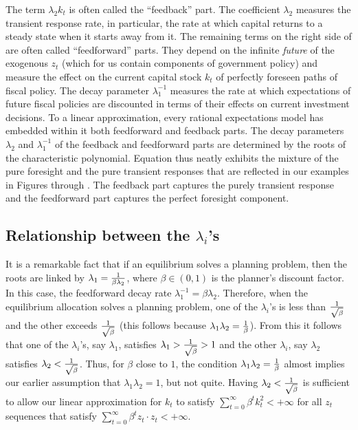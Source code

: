 The term $\lambda_2 k_t$ is often called
the ``feedback'' part.  The coefficient $\lambda_2$
measures the transient response rate, in particular, the rate at which
capital returns to a steady state when it starts away
from it.  The remaining terms on the right side of   
are often called  ``feedforward'' parts. They depend on the
infinite {\it future\/} of the exogenous $z_t$ (which for us
contain   components of government policy) and measure the
effect on the current capital stock $k_t$ of perfectly foreseen
paths of fiscal policy.
The decay parameter $\lambda_1^{-1}$ measures the rate at which
expectations of future fiscal policies are discounted in terms
of their effects on current investment decisions.
To a linear approximation, every rational expectations model has embedded within it both
feedforward and feedback parts.  The decay parameters
$\lambda_2$ and $\lambda_1^{-1}$ of the feedback and feedforward
parts are determined by the roots of the characteristic
polynomial.
  Equation  thus neatly exhibits the mixture of the
pure foresight and  the pure transient  responses   that are
reflected in our examples in Figures   through . The
feedback part captures the purely transient response and the
feedforward part captures the perfect foresight component.

\subsection{Relationship between the $\lambda_i$'s}

It is a remarkable
fact that if an equilibrium solves a planning problem,
then the roots are linked by  $\lambda_1 = { 1 \over \beta \lambda_2}$, where
$\beta \in (0,1)$ is the planner's discount factor.  In this case, the feedforward decay rate
$\lambda_1^{-1} = \beta \lambda_2$.
  Therefore, when the equilibrium allocation
solves a planning problem, one of the $\lambda_i$'s is less than
${1\over \sqrt {\beta}}$ and the other exceeds ${1\over \sqrt {\beta}}$
(this follows because $\lambda_1 \lambda_2 = {1\over\beta}$). From this it follows
that one of the $\lambda_i$'s, say $\lambda_1$, satisfies $\lambda_1 > {1 \over \sqrt{\beta}} > 1$
and  the other $\lambda_i$, say $\lambda_2$ satisfies $\lambda_2 < {1\over \sqrt{\beta}}$.
Thus, for $\beta$ close to $1$,
the condition $\lambda_1 \lambda_2 = {1\over \beta}$ almost implies our earlier assumption
that $\lambda_1 \lambda_2=1$, but not quite.
Having $\lambda_2 < {1 \over \sqrt{\beta}}$ is sufficient to allow  our linear approximation for $k_t$
to satisfy $\sum_{t=0}^\infty \beta^t k_t^2 < +\infty$ for all $z_t$ sequences that satisfy
$\sum_{t=0}^\infty \beta^t z_t \cdot z_t < + \infty$.

